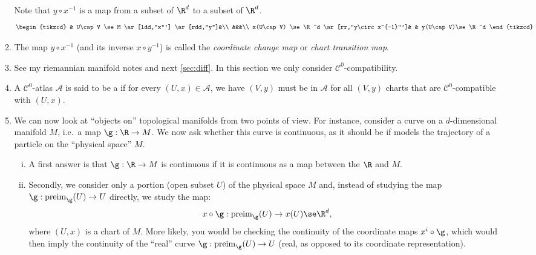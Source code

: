 \documentclass{article}
\begin{document}
\begin{enumerate}
\begin{enumerate}
Note that $y\circ x^{-1}$ is a map from a subset of $\R^d$ to a subset of $\R^d$.
\begin{equation*}
\begin{tikzcd}
& U\cap V \se M \ar[ldd,"x"'] \ar[rdd,"y"]&\\
&&&\\
x(U\cap V) \se \R^d \ar[rr,"y\circ x^{-1}"']& & y(U\cap V)\se \R^d
\end{tikzcd}
\end{equation*}
\item 
The map $y\circ x^{-1}$ (and its inverse $x\circ y^{-1}$) is called the \emph{coordinate change map} or \emph{chart transition map}.
\item {} See my riemannian manifold notes and next \cref{sec:diff}. In this section we only consider $\mathcal{C}^0$-compatibility.
\item {}
A $\mathcal{C}^0$-atlas $\mathscr{A}$ is said to be a  if for every $(U,x)\in\mathscr{A}$, we have $(V,y)$  must be in $\mathscr{A}$ for all $(V,y)$ charts that are $\mathcal{C}^0$-compatible with $(U,x)$.
\item {}
We can now look at ``objects on'' topological manifolds from two points of view. For instance, consider a curve on a $d$-dimensional manifold $M$, i.e.\ a map $\g: \R\to M$. We now ask whether this curve is continuous, as it should be if models the trajectory of a particle on the ``physical space'' $M$.
\begin{enumerate}[i).]
    \item {} A first answer is that $\g: \R \to M$ is continuous if it is continuous as a map between the  $\R$ and $M$.
    \item  {} Secondly, we consider only a portion (open subset $U$) of the physical space $M$ and, instead of studying the map $\g:\mathrm{preim}_\g(U)\to U$ directly, we study the map:
\begin{equation*}
x\circ \g: \mathrm{preim}_\g(U) \to x(U) \se \R^d,
\end{equation*}
where $(U,x)$ is a chart of $M$. More likely, you would be checking the continuity of the coordinate maps $x^i\circ \g$, which would then imply the continuity of the ``real'' curve $\g:\mathrm{preim}_\g(U)\to U$ (real, as opposed to its coordinate representation).
\end{enumerate}
\begin{itemize}

\end{itemize}
\end{enumerate}
\end{enumerate}
\end{document}

